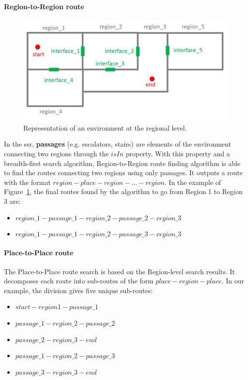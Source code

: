 \documentclass[a4paper,11pt,twoside]{StyleThese}
\begin{document}
\paragraph{Region-to-Region route}

\begin{figure}[b]
	\centering
	\includegraphics[scale=0.17]{figures/chapter3/regions.png}
	\caption{\label{fig:chap3_regions} Representation of an environment at the regional level.}
\end{figure}

In the \acrshort{ssr}, \textbf{passages} (e.g. escalators, stairs) are elements of the environment connecting two regions through the $isIn$ property. With this property and a breadth-first search algorithm, Region-to-Region route finding algorithm is able to find the routes connecting two regions using only passages. It outputs a route with the format $region - place - region - ... - region$. In the example of Figure~\ref{fig:chap3_regions}, the final routes found by the algorithm to go from Region 1 to Region 3 are:

\begin{itemize}
	\item \(region\_1 - passage\_1 - region\_2 - passage\_2 - region\_3\)
	\item \(region\_1 - passage\_1 - region\_2 - passage\_3 - region\_3\)
\end{itemize}


\paragraph{Place-to-Place route}

The Place-to-Place route search is based on the Region-level search results. It decomposes each route into sub-routes of the form $place - region - place$. In our example, the division gives five unique sub-routes:
\begin{itemize}
	\item \(start - region 1 - passage\_1\)
	\item \(passage\_1 - region\_2 - passage\_2\)
	\item \(passage\_2 - region\_3 - end\)
	\item \(passage\_1 - region\_2 - passage\_3\)
	\item \(passage\_3 - region\_3 - end\)
\end{itemize}
\end{document}
